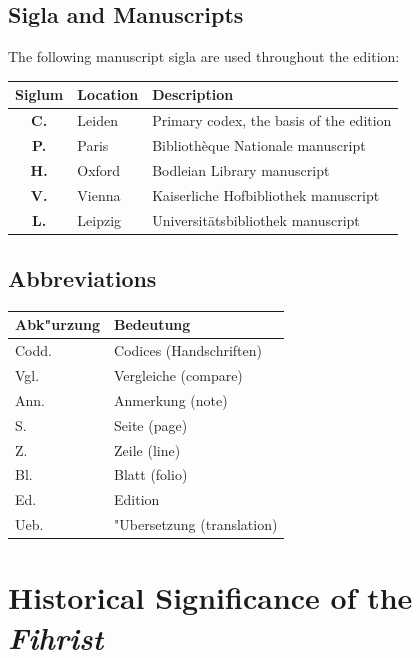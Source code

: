 \documentclass[11pt,a4paper]{article}
\newenvironment{german}{\germanfont}{}
\begin{document}
\subsection{Sigla and Manuscripts}

The following manuscript sigla are used throughout the edition:

\begin{longtable}{@{}clp{8cm}@{}}
\toprule
\textbf{Siglum} & \textbf{Location} & \textbf{Description} \\
\midrule
\endhead
\textbf{C.} & Leiden & Primary codex, the basis of the edition \\
\textbf{P.} & Paris & Biblioth\`eque Nationale manuscript \\
\textbf{H.} & Oxford & Bodleian Library manuscript \\
\textbf{V.} & Vienna & Kaiserliche Hofbibliothek manuscript \\
\textbf{L.} & Leipzig & Universit\=atsbibliothek manuscript \\
\bottomrule
\end{longtable}

\subsection{Abbreviations}

\begin{german}

\begin{longtable}{@{}lp{9cm}@{}}
\toprule
\textbf{Abk"urzung} & \textbf{Bedeutung} \\
\midrule
\endhead
Codd. & Codices (Handschriften) \\
Vgl. & Vergleiche (compare) \\
Ann. & Anmerkung (note) \\
S. & Seite (page) \\
Z. & Zeile (line) \\
Bl. & Blatt (folio) \\
Ed. & Edition \\
Ueb. & "Ubersetzung (translation) \\
\bottomrule
\end{longtable}

\end{german}

\newpage

\section{Historical Significance of the \textit{Fihrist}}
\end{document}
